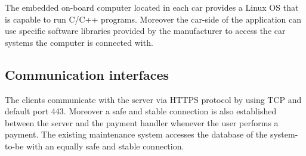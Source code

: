 The embedded on-board computer located in each car provides a Linux OS that is capable to run C/C++ programs. Moreover the car-side of the application can use specific software libraries provided by the manufacturer to access the car systems the computer is connected with.

\subsection{Communication interfaces}
The clients communicate with the server via HTTPS protocol by using TCP and default port 443.
Moreover a safe and stable connection is also established between the server and the payment handler whenever the user performs a payment. The existing maintenance system accesses the database of the system-to-be with an equally safe and stable connection.